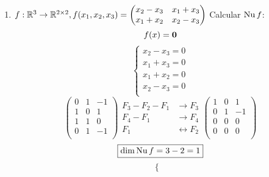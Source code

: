 \documentclass[../practica.root.tex]{subfiles}
\begin{document}
\begin{enumerate}
\begin{enumerate}
              \item $ f : \mathbb{R}^3 \to \mathbb{R}^{2\times2}, f(x_1, x_2, x_3) =
                    \begin{pmatrix}
                        x_2 - x_3 & x_1 + x_3 \\
                        x_1 + x_2 & x_2 - x_3
                    \end{pmatrix} $
                    Calcular $\operatorname{Nu} f$:
                    \[ f(x) = \mathbf{0} \]
                    \[
                        \begin{cases}
                            x_2 - x_3 = 0 \\
                            x_1 + x_3 = 0 \\
                            x_1 + x_2 = 0 \\
                            x_2 - x_3 = 0 \\
                        \end{cases}
                    \] \[
                        \begin{pmatrix}
                            0 & 1 & -1 \\
                            1 & 0 & 1  \\
                            1 & 1 & 0  \\
                            0 & 1 & -1 \\
                        \end{pmatrix}
                        \begin{array}{rl}
                            F_3 - F_2 - F_1 & \to F_3             \\
                            F_4 - F_1       & \to F_4             \\
                            F_1             & \leftrightarrow F_2
                        \end{array}
                        \begin{pmatrix}
                            1 & 0 & 1  \\
                            0 & 1 & -1 \\
                            0 & 0 & 0  \\
                            0 & 0 & 0  \\
                        \end{pmatrix}
                    \] \[
                        \boxed{\dim\operatorname{Nu} f = 3 - 2 = 1}
                    \] \[
                        \begin{cases}

\end{cases}\]
\end{enumerate}
\end{enumerate}
\end{document}

